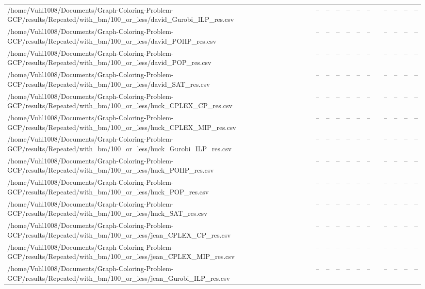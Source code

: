 \begin{table}[htbp]
\begin{tabular}{llllllllllll}
/home/Vuhl1008/Documents/Graph-Coloring-Problem-GCP/results/Repeated/with\_bm/100\_or\_less/david\_Gurobi\_ILP\_res.csv & -- & -- & -- & -- & -- & -- & {} & -- & -- & -- & -- \\
/home/Vuhl1008/Documents/Graph-Coloring-Problem-GCP/results/Repeated/with\_bm/100\_or\_less/david\_POHP\_res.csv & -- & -- & -- & -- & -- & -- & {} & -- & -- & -- & -- \\
/home/Vuhl1008/Documents/Graph-Coloring-Problem-GCP/results/Repeated/with\_bm/100\_or\_less/david\_POP\_res.csv & -- & -- & -- & -- & -- & -- & {} & -- & -- & -- & -- \\
/home/Vuhl1008/Documents/Graph-Coloring-Problem-GCP/results/Repeated/with\_bm/100\_or\_less/david\_SAT\_res.csv & -- & -- & -- & -- & -- & -- & {} & -- & -- & -- & -- \\
/home/Vuhl1008/Documents/Graph-Coloring-Problem-GCP/results/Repeated/with\_bm/100\_or\_less/huck\_CPLEX\_CP\_res.csv & -- & -- & -- & -- & -- & -- & {} & -- & -- & -- & -- \\
/home/Vuhl1008/Documents/Graph-Coloring-Problem-GCP/results/Repeated/with\_bm/100\_or\_less/huck\_CPLEX\_MIP\_res.csv & -- & -- & -- & -- & -- & -- & {} & -- & -- & -- & -- \\
/home/Vuhl1008/Documents/Graph-Coloring-Problem-GCP/results/Repeated/with\_bm/100\_or\_less/huck\_Gurobi\_ILP\_res.csv & -- & -- & -- & -- & -- & -- & {} & -- & -- & -- & -- \\
/home/Vuhl1008/Documents/Graph-Coloring-Problem-GCP/results/Repeated/with\_bm/100\_or\_less/huck\_POHP\_res.csv & -- & -- & -- & -- & -- & -- & {} & -- & -- & -- & -- \\
/home/Vuhl1008/Documents/Graph-Coloring-Problem-GCP/results/Repeated/with\_bm/100\_or\_less/huck\_POP\_res.csv & -- & -- & -- & -- & -- & -- & {} & -- & -- & -- & -- \\
/home/Vuhl1008/Documents/Graph-Coloring-Problem-GCP/results/Repeated/with\_bm/100\_or\_less/huck\_SAT\_res.csv & -- & -- & -- & -- & -- & -- & {} & -- & -- & -- & -- \\
/home/Vuhl1008/Documents/Graph-Coloring-Problem-GCP/results/Repeated/with\_bm/100\_or\_less/jean\_CPLEX\_CP\_res.csv & -- & -- & -- & -- & -- & -- & {} & -- & -- & -- & -- \\
/home/Vuhl1008/Documents/Graph-Coloring-Problem-GCP/results/Repeated/with\_bm/100\_or\_less/jean\_CPLEX\_MIP\_res.csv & -- & -- & -- & -- & -- & -- & {} & -- & -- & -- & -- \\
/home/Vuhl1008/Documents/Graph-Coloring-Problem-GCP/results/Repeated/with\_bm/100\_or\_less/jean\_Gurobi\_ILP\_res.csv & -- & -- & -- & -- & -- & -- & {} & -- & -- & -- & -- \\

\end{tabular}
\end{table}
